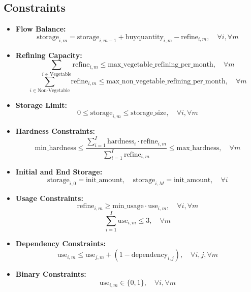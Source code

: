 \documentclass{article}
\begin{document}
\subsection*{Constraints}
\begin{itemize}
    \item \textbf{Flow Balance:}
    \[
    \text{storage}_{i,m} = \text{storage}_{i,m-1} + \text{buyquantity}_{i,m} - \text{refine}_{i,m}, \quad \forall i, \forall m
    \]
    \item \textbf{Refining Capacity:}
    \[
    \sum_{i \in \text{Vegetable}} \text{refine}_{i,m} \leq \text{max\_vegetable\_refining\_per\_month}, \quad \forall m
    \]
    \[
    \sum_{i \in \text{Non-Vegetable}} \text{refine}_{i,m} \leq \text{max\_non\_vegetable\_refining\_per\_month}, \quad \forall m
    \]
    \item \textbf{Storage Limit:}
    \[
    0 \leq \text{storage}_{i,m} \leq \text{storage\_size}, \quad \forall i, \forall m
    \]
    \item \textbf{Hardness Constraints:}
    \[
    \text{min\_hardness} \leq \frac{\sum_{i=1}^{I} \text{hardness}_i \cdot \text{refine}_{i,m}}{\sum_{i=1}^{I} \text{refine}_{i,m}} \leq \text{max\_hardness}, \quad \forall m
    \]
    \item \textbf{Initial and End Storage:}
    \[
    \text{storage}_{i,0} = \text{init\_amount}, \quad \text{storage}_{i,M} = \text{init\_amount}, \quad \forall i
    \]
    \item \textbf{Usage Constraints:}
    \[
    \text{refine}_{i,m} \geq \text{min\_usage} \cdot \text{use}_{i,m}, \quad \forall i, \forall m
    \]
    \[
    \sum_{i=1}^{I} \text{use}_{i,m} \leq 3, \quad \forall m
    \]
    \item \textbf{Dependency Constraints:}
    \[
    \text{use}_{i,m} \leq \text{use}_{j,m} + (1 - \text{dependency}_{i,j}), \quad \forall i, j, \forall m
    \]
    \item \textbf{Binary Constraints:}
    \[
    \text{use}_{i,m} \in \{0, 1\}, \quad \forall i, \forall m
    \]
\end{itemize}
\end{document}
